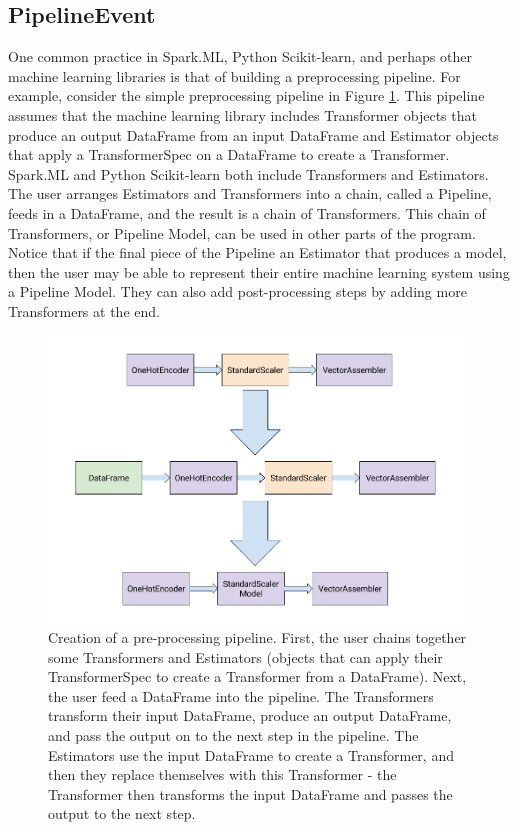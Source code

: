 \subsection{PipelineEvent}
One common practice in Spark.ML, Python Scikit-learn, and perhaps other machine learning
libraries is that of building a preprocessing pipeline. For example, consider the simple
preprocessing pipeline in Figure \ref{fig:preprocessing_pipeline}. This pipeline assumes
that the machine learning library includes Transformer objects that produce an output DataFrame
from an input DataFrame and Estimator objects that apply a TransformerSpec on a DataFrame to create
a Transformer. Spark.ML and Python Scikit-learn both include Transformers and Estimators. The user
arranges Estimators and Transformers into a chain, called a Pipeline, feeds in a DataFrame, and the result is a chain
of Transformers. This chain of Transformers, or Pipeline Model, can be used in other parts of the 
program. Notice that if the final piece of the Pipeline an Estimator that produces a model, then
the user may be able to represent their entire machine learning system using a Pipeline Model. They can also
add post-processing steps by adding more Transformers at the end.

\begin{figure}
  \centering
  \includegraphics[height=3.0in]{preprocessing_pipeline}
  \caption{
    Creation of a pre-processing pipeline. First, the user chains together some
    Transformers and Estimators (objects that can apply their TransformerSpec to
    create a Transformer from a DataFrame). Next, the user feed a DataFrame into the pipeline. The
    Transformers transform their input DataFrame, produce an output DataFrame, and
    pass the output on to the next step in the pipeline. The Estimators use the input DataFrame
    to create a Transformer, and then they replace themselves with this Transformer - the
    Transformer then transforms the input DataFrame and passes the output to the next step.
  }
  \label{fig:preprocessing_pipeline}
\end{figure}

